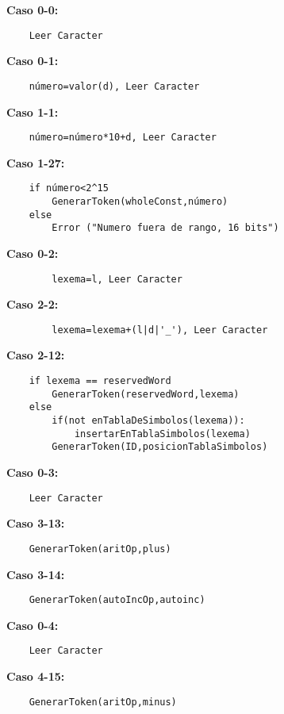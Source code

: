 \documentclass{article}
\begin{document}
\textbf{Caso 0-0:}
\begin{verbatim}
    Leer Caracter
\end{verbatim}

\textbf{Caso 0-1:}
\begin{verbatim}
    número=valor(d), Leer Caracter
\end{verbatim}

\textbf{Caso 1-1:}
\begin{verbatim}
    número=número*10+d, Leer Caracter
\end{verbatim}

\textbf{Caso 1-27:}
\begin{verbatim}
    if número<2^15 
        GenerarToken(wholeConst,número)
    else 
        Error ("Numero fuera de rango, 16 bits")
\end{verbatim}

\textbf{Caso 0-2:}
\begin{verbatim}
        lexema=l, Leer Caracter
\end{verbatim}

\textbf{Caso 2-2:}
\begin{verbatim}
        lexema=lexema+(l|d|'_'), Leer Caracter
\end{verbatim}

\textbf{Caso 2-12:}
\begin{verbatim}
    if lexema == reservedWord
        GenerarToken(reservedWord,lexema)
    else 
        if(not enTablaDeSimbolos(lexema)):
            insertarEnTablaSimbolos(lexema)
        GenerarToken(ID,posicionTablaSimbolos)
\end{verbatim}

\textbf{Caso 0-3:}
\begin{verbatim}
    Leer Caracter
\end{verbatim}

\textbf{Caso 3-13:}
\begin{verbatim}
    GenerarToken(aritOp,plus)
\end{verbatim}

\textbf{Caso 3-14:}
\begin{verbatim}
    GenerarToken(autoIncOp,autoinc)
\end{verbatim}

\textbf{Caso 0-4:}
\begin{verbatim}
    Leer Caracter
\end{verbatim}
	

\textbf{Caso 4-15:}
\begin{verbatim}
    GenerarToken(aritOp,minus)
\end{verbatim}
\end{document}
